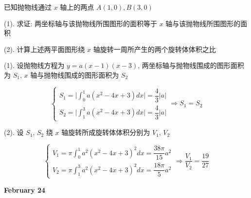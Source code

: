 \begin{example}[][Exam: 28.4.4]
	已知抛物线通过 $x$ 轴上的两点 $A(1,0),B(3,0)$

(1). 求证: 两坐标轴与该抛物线所围图形的面积等于 $x$ 轴与该抛物线所围图形的面积

(2). 计算上述两平面图形绕 $x$ 轴旋转一周所产生的两个旋转体体积之比
\end{example}
\begin{solution}

(1). 设抛物线方程为 $y=a(x-1)(x-3)$, 两坐标轴与抛物线围成的图形面积为 $S_{1}$, $x$ 轴与抛物线围成的图形面积为 $S_{2}$

$$\begin{cases}
  S_{1}= \big|\int_{0}^{1}a(x^{2}-4x+3)dx\big| = \dfrac{4}{3}|a|\\
  S_{2} = \big|\int_{1}^{3}a(x^{2}-4x+3)dx\big| = \dfrac{4}{3}|a|
\end{cases}\Rightarrow S_{1} = S_{2}$$

(2). 设 $S_{1}$, $S_{2}$ 绕 $x$ 轴旋转所成旋转体体积分别为 $V_{1}$, $V_{2}$

$$\begin{cases}
  V_{1} = \pi\int_{0}^{1}a^{2}(x^{2}-4x+3)^{2}dx = \dfrac{38\pi}{15}a^{2}\\
  V_{2} = \pi\int_{1}^{3}a^{2}(x^{2}-4x+3)^{2}dx = \dfrac{18\pi}{5}a^{2}
\end{cases}\Rightarrow \dfrac{V_{1}}{V_{2}} = \dfrac{19}{27}$$
\end{solution}

\textcolor{purplea}{\textbf{February 24}}

